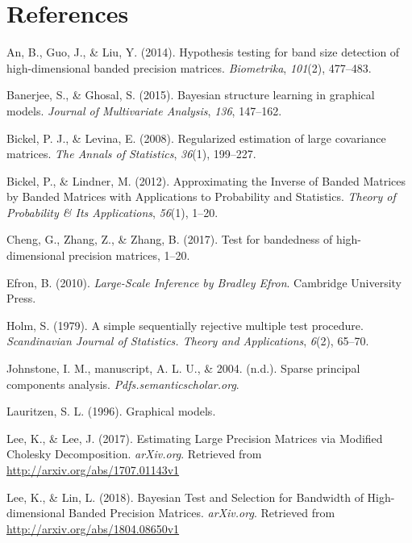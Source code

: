 \documentclass{beamer}
\begin{document}
\section{References}
\begin{frame}[allowframebreaks]


\hypertarget{refs}{}
\leavevmode\hypertarget{ref-An:2014jc}{}%
An, B., Guo, J., \& Liu, Y. (2014). Hypothesis testing for band size
detection of high-dimensional banded precision matrices.
\emph{Biometrika}, \emph{101}(2), 477--483.

\leavevmode\hypertarget{ref-Banerjee:2015ex}{}%
Banerjee, S., \& Ghosal, S. (2015). Bayesian structure learning in
graphical models. \emph{Journal of Multivariate Analysis}, \emph{136},
147--162.

\leavevmode\hypertarget{ref-Bickel:2008ez}{}%
Bickel, P. J., \& Levina, E. (2008). Regularized estimation of large
covariance matrices. \emph{The Annals of Statistics}, \emph{36}(1),
199--227.

\leavevmode\hypertarget{ref-Bickel:2012ek}{}%
Bickel, P., \& Lindner, M. (2012). Approximating the Inverse of Banded
Matrices by Banded Matrices with Applications to Probability and
Statistics. \emph{Theory of Probability \& Its Applications},
\emph{56}(1), 1--20.

\leavevmode\hypertarget{ref-Cheng:2017jh}{}%
Cheng, G., Zhang, Z., \& Zhang, B. (2017). Test for bandedness of
high-dimensional precision matrices, 1--20.

\leavevmode\hypertarget{ref-Efron:2010jd}{}%
Efron, B. (2010). \emph{Large-Scale Inference by Bradley Efron}.
Cambridge University Press.

\leavevmode\hypertarget{ref-Holm:1979ws}{}%
Holm, S. (1979). A simple sequentially rejective multiple test
procedure. \emph{Scandinavian Journal of Statistics. Theory and
Applications}, \emph{6}(2), 65--70.

\leavevmode\hypertarget{ref-Johnstone:tc}{}%
Johnstone, I. M., manuscript, A. L. U., \& 2004. (n.d.). Sparse
principal components analysis. \emph{Pdfs.semanticscholar.org}.

\leavevmode\hypertarget{ref-Lauritzen:1996te}{}%
Lauritzen, S. L. (1996). Graphical models.

\leavevmode\hypertarget{ref-Lee:2017uq}{}%
Lee, K., \& Lee, J. (2017). Estimating Large Precision Matrices via
Modified Cholesky Decomposition. \emph{arXiv.org}. Retrieved from
\url{http://arxiv.org/abs/1707.01143v1}

\leavevmode\hypertarget{ref-Lee:2018vj}{}%
Lee, K., \& Lin, L. (2018). Bayesian Test and Selection for Bandwidth of
High-dimensional Banded Precision Matrices. \emph{arXiv.org}. Retrieved
from \url{http://arxiv.org/abs/1804.08650v1}


\end{frame}
\end{document}
